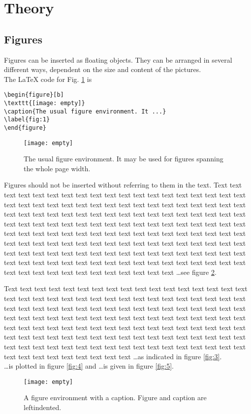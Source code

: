 \section{Theory}
\subsection{Figures}
Figures can be inserted as floating objects. They can be arranged in several different ways, dependent on the size and content of the pictures.\\
The \LaTeX{} code for Fig. \ref{fig:1} is
\begin{verbatim}
\begin{figure}[b]
\texttt{[image: empty]}
\caption{The usual figure environment. It ...}
\label{fig:1}
\end{figure}
\end{verbatim}
\begin{figure}[b]
\texttt{[image: empty]}
\caption{The usual figure environment. It may be used for figures spanning the
  whole page width.}
\label{fig:1}
\end{figure}
Figures should not be inserted without referring to them in the text. Text text text text text text text text text text text text text text text text text text text text text text text text text text text text text text text text text text text text text text text text text text text text text text text text text text text text text text text text text text text text text text text text text text text text text text text text text text text text text text text text text text text text text text text text text text text text text text text text text text text text text text text text text text text text text text text text text text text text text text text text text text text text text text text text text text text text text text text text text text text text text text text text text text text text text text \dots see figure \ref{fig:2}.

Text text text text text text text text text text text text text text text text text text text text text text text text text text text text text text text text text text text text text text text text text text text text text text text text text text text text text text text text text text text text text text text text text text text text text text text text text text text text text text text text text text text text text text text text text text text text text text text text text text text text text text text text text text text text text text text text text text text text text text text text text text text text text text text text \dots as indicated in figure \ref{fig:3}.\\
\dots is plotted in figure \ref{fig:4} and \dots is given in figure \ref{fig:5}.
\begin{figure}%
  \texttt{[image: empty]}
\caption{A figure  environment with a caption.
Figure and caption are leftindented.}
\label{fig:2}
\end{figure}

